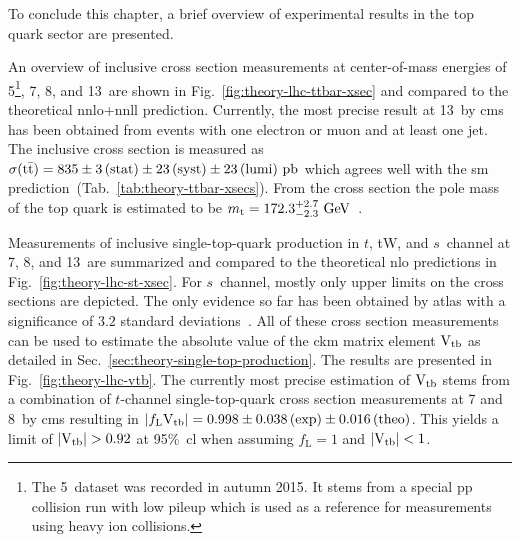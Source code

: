 To conclude this chapter, a brief overview of experimental results in the top quark sector are presented.

An overview of inclusive \ttbar cross section measurements at center-of-mass energies of 5\footnote{The 5~\TeV dataset was recorded in autumn 2015. It stems from a special pp collision run with low pileup which is used as a reference for measurements using heavy ion collisions.}, 7, 8, and 13~\TeV are shown in Fig.~\ref{fig:theory-lhc-ttbar-xsec} and compared to the theoretical \gls{nnlo}+\gls{nnll} prediction. Currently, the most precise result at 13~\TeV by \gls{cms} has been obtained from events with one electron or muon and at least one jet. The inclusive cross section is measured as $\sigma({\mathrm{t}\bar{\mathrm{t}}})=835\pm3\,\mathrm{(stat)}\pm23\,\mathrm{(syst)}\pm23\,\mathrm{(lumi)}~\mathrm{pb}$ which agrees well with the \gls{sm} prediction~(Tab.~\ref{tab:theory-ttbar-xsecs}). From the cross section the pole mass of the top quark is estimated to be $m_\mathrm{t}=172.3^{+2.7}_{-2.3}~\mathrm{GeV}$~\cite{CMS-PAS-TOP-16-006}.

Measurements of inclusive single-top-quark production in $t$, tW, and $s$~channel at 7, 8, and 13~\TeV are summarized and compared to the theoretical \gls{nlo} predictions in Fig.~\ref{fig:theory-lhc-st-xsec}. For $s$~channel, mostly only upper limits on the cross sections are depicted. The only evidence so far has been obtained by \gls{atlas} with a significance of $3.2$ standard deviations~\cite{Aad:2015upn}. All of these cross section measurements can be used to estimate the absolute value of the \gls{ckm} matrix element ${\mathrm{V}_\mathrm{tb}}$ as detailed in Sec.~\ref{sec:theory-single-top-production}. The results are presented in Fig.~\ref{fig:theory-lhc-vtb}. The currently most precise estimation of ${\mathrm{V}_\mathrm{tb}}$ stems from a combination of $t$-channel single-top-quark cross section measurements at 7 and 8~\TeV by \gls{cms} resulting in $|f_\mathrm{L}{\mathrm{V}_\mathrm{tb}}|=0.998\pm0.038\,\mathrm{(exp)}\pm0.016\,\mathrm{(theo)}$. This yields a limit of $|\vtb|>0.92$ at 95\%~\gls{cl} when assuming $f_\mathrm{L}=1$ and $|{\mathrm{V}_\mathrm{tb}}|<1$.


